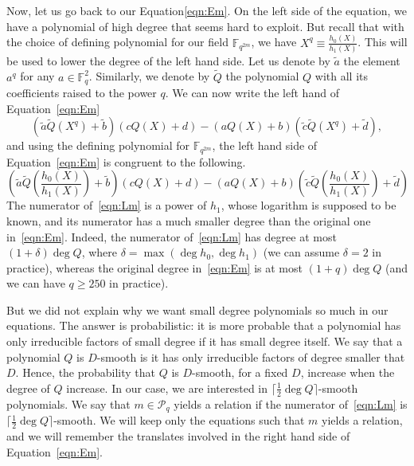\documentclass[a4paper,11pt]{article}
\theoremstyle{break}
\theoremstyle{sc}
\theoremstyle{definition}
\theoremstyle{remark}
\begin{document}
Now, let us go back to our Equation\eqref{eqn:Em}. On the left side of the equation, we have a polynomial of high degree that seems
hard to exploit. But recall that with the choice of defining polynomial for our
field $\mathbb{F}_{q^{2m}}$, we have $X^q \equiv \frac{h_0(X)}{h_1(X)}$. This will
be used to lower the degree of the left hand side. Let us denote by $\tilde a$
the element $a^q$ for any $a\in\mathbb{F}_q^2$. Similarly, we denote by
$\widetilde Q$ the polynomial $Q$ with all its coefficients raised to the power
$q$. We can now write the left hand of Equation~\eqref{eqn:Em}
\[
  (\tilde a \widetilde Q (X^q)+\tilde b)(cQ(X)+d)-(aQ(X)+b)(\tilde c\widetilde
  Q(X^q)+\tilde d),
\]
and using the defining polynomial for $\mathbb{F}_{q^{2m}}$, the left hand side of
Equation~\eqref{eqn:Em} is congruent to the following.
\begin{equation}
  \tag{$\mathcal L_m$}
  \left(\tilde a \widetilde Q \left(\frac{h_0(X)}{h_1(X)}\right)+\tilde
  b\right)(cQ(X)+d)-(aQ(X)+b)\left(\tilde c\widetilde
  Q\left(\frac{h_0(X)}{h_1(X)}\right)+\tilde d\right)
  \label{eqn:Lm}
\end{equation}
The numerator of~\eqref{eqn:Lm} is a power of $h_1$, whose logarithm is supposed
to be known, and its numerator has a much smaller degree than the original one
in~\eqref{eqn:Em}. Indeed, the numerator of~\eqref{eqn:Lm} has degree at most
$(1+\delta)\deg Q$, where $\delta=\max(\deg h_0, \deg h_1)$ (we can assume
$\delta=2$ in practice), whereas the original degree in~\eqref{eqn:Em} is at
most $(1+q)\deg Q$ (and we can have $q\geq 250$ in practice).

But we did not explain why we want small degree polynomials so much in our
equations. The answer is probabilistic: it is more probable that a polynomial
has only irreducible factors of small degree if it has small degree itself. We
say that a polynomial $Q$ is $D$-smooth is it has only irreducible factors of
degree smaller that $D$. Hence, the probability that $Q$ is $D$-smooth, for a
fixed $D$, increase when the degree of $Q$ increase. In our case, we are
interested in $\lceil\frac{1}{2}\deg Q\rceil$-smooth polynomials. We say that
$m\in\mathcal P_q$ yields a relation if the numerator of~\eqref{eqn:Lm} is
$\lceil\frac{1}{2}\deg Q\rceil$-smooth. We will keep only the equations such
that $m$ yields a relation, and we will remember the translates involved in
the right hand side of Equation~\eqref{eqn:Em}.
\end{document}
